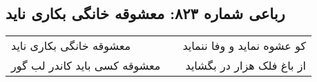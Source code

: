 \begin{center}
\section*{رباعی شماره ۸۲۳: معشوقه خانگی بکاری ناید}
\label{sec:0823}
\begin{longtable}{l p{0.5cm} r}
معشوقه خانگی بکاری ناید
&&
کو عشوه نماید و وفا ننماید
\\
معشوقه کسی باید کاندر لب گور
&&
از باغ فلک هزار در بگشاید
\\
\end{longtable}
\end{center}

